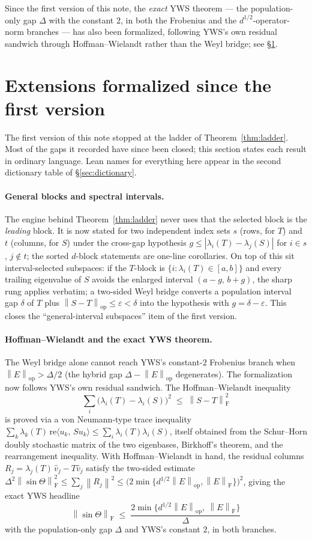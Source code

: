 \documentclass[11pt]{article}
\newcommand{\norm}[1]{\left\lVert #1\right\rVert}
\newcommand{\eps}{\varepsilon}
\newcommand{\F}{\mathrm{F}}
\newcommand{\op}{\mathrm{op}}
\newcommand{\inner}[2]{\langle #1,\,#2\rangle}
\newcommand{\gap}{g}
\newcommand{\sinT}{\sin\Theta}
\theoremstyle{remark}
\begin{document}
Since the first version of this note, the \emph{exact} YWS theorem --- the
population-only gap $\Delta$ with the constant $2$, in both the Frobenius and
the $d^{1/2}$-operator-norm branches --- has also been formalized, following
YWS's own residual sandwich through Hoffman--Wielandt rather than the Weyl
bridge; see \S\ref{sec:extensions}.

\section{Extensions formalized since the first version}\label{sec:extensions}

The first version of this note stopped at the ladder of
Theorem~\ref{thm:ladder}.  Most of the gaps it recorded have since been closed;
this section states each result in ordinary language.  Lean names for
everything here appear in the second dictionary table of
\S\ref{sec:dictionary}.

\paragraph{General blocks and spectral intervals.}
The engine behind Theorem~\ref{thm:ladder} never uses that the selected block
is the \emph{leading} block.  It is now stated for two independent index sets
$s$ (rows, for $T$) and $t$ (columns, for $S$) under the cross-gap hypothesis
$\gap\le|\lambda_i(T)-\lambda_j(S)|$ for $i\in s$, $j\notin t$; the sorted
$d$-block statements are one-line corollaries.  On top of this sit
interval-selected subspaces: if the $T$-block is
$\{i:\lambda_i(T)\in[a,b]\}$ and every trailing eigenvalue of $S$ avoids the
enlarged interval $(a-\gap,\,b+\gap)$, the sharp rung applies verbatim; a
two-sided Weyl bridge converts a population interval gap $\delta$ of $T$ plus
$\norm{S-T}_{\op}\le\eps<\delta$ into the hypothesis with $\gap=\delta-\eps$.
This closes the ``general-interval subspaces'' item of the first version.

\paragraph{Hoffman--Wielandt and the exact YWS theorem.}
The Weyl bridge alone cannot reach YWS's constant-$2$ Frobenius branch when
$\norm{E}_{\op}>\Delta/2$ (the hybrid gap $\Delta-\norm{E}_{\op}$ degenerates).
The formalization now follows YWS's own residual sandwich.  The
Hoffman--Wielandt inequality
\[
  \sum_i\bigl(\lambda_i(T)-\lambda_i(S)\bigr)^2\;\le\;\norm{S-T}_{\F}^2
\]
is proved via a von Neumann-type trace inequality
$\sum_k\lambda_k(T)\,\mathrm{re}\inner{u_k}{Su_k}\le\sum_i\lambda_i(T)\lambda_i(S)$,
itself obtained from the Schur--Horn doubly stochastic matrix of the two
eigenbases, Birkhoff's theorem, and the rearrangement inequality.  With
Hoffman--Wielandt in hand, the residual columns
$R_j=\lambda_j(T)\,\widehat v_j-T\widehat v_j$ satisfy the two-sided estimate
$\Delta^2\norm{\sinT}_{\F}^2\le\sum_j\norm{R_j}^2\le
\bigl(2\min\{d^{1/2}\norm{E}_{\op},\norm{E}_{\F}\}\bigr)^2$, giving the exact
YWS headline
\[
  \norm{\sinT}_{\F}\;\le\;\frac{2\min\{d^{1/2}\norm{E}_{\op},\ \norm{E}_{\F}\}}{\Delta}
\]
with the population-only gap $\Delta$ and YWS's constant $2$, in both branches.
\end{document}
